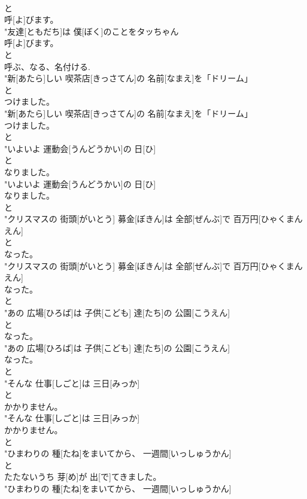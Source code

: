 \documentclass[8pt]{extreport}
\begin{document}
\begin{CJK}{UTF8}{min}
\\	と
\\	呼[よ]びます。
\\	"友達[ともだち]は 僕[ぼく]のことをタッちゃん
\\	呼[よ]びます。
\\	と
\\	呼ぶ、なる、名付ける. 
\\	"新[あたら]しい 喫茶店[きっさてん]の 名前[なまえ]を「ドリーム」
\\	と
\\	つけました。
\\	"新[あたら]しい 喫茶店[きっさてん]の 名前[なまえ]を「ドリーム」
\\	つけました。
\\	と
\\	"いよいよ 運動会[うんどうかい]の 日[ひ]
\\	と
\\	なりました。
\\	"いよいよ 運動会[うんどうかい]の 日[ひ]
\\	なりました。
\\	と
\\	"クリスマスの 街頭[がいとう] 募金[ぼきん]は 全部[ぜんぶ]で 百万円[ひゃくまんえん]
\\	と
\\	なった。
\\	"クリスマスの 街頭[がいとう] 募金[ぼきん]は 全部[ぜんぶ]で 百万円[ひゃくまんえん]
\\	なった。
\\	と
\\	"あの 広場[ひろば]は 子供[こども] 達[たち]の 公園[こうえん]
\\	と
\\	なった。
\\	"あの 広場[ひろば]は 子供[こども] 達[たち]の 公園[こうえん]
\\	なった。
\\	と
\\	"そんな 仕事[しごと]は 三日[みっか]
\\	と
\\	かかりません。
\\	"そんな 仕事[しごと]は 三日[みっか]
\\	かかりません。
\\	と
\\	"ひまわりの 種[たね]をまいてから、 一週間[いっしゅうかん]
\\	と
\\	たたないうち 芽[め]が 出[で]てきました。
\\	"ひまわりの 種[たね]をまいてから、 一週間[いっしゅうかん]

\end{CJK}
\end{document}
